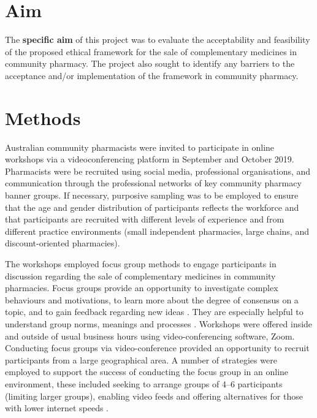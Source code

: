 \documentclass[11pt,a4paper]{article}
\begin{document}


\section{Aim}\label{aim}

The \textbf{specific aim} of this project was to evaluate the
acceptability and feasibility of the proposed ethical framework for the
sale of complementary medicines in community pharmacy. The project also
sought to identify any barriers to the acceptance and/or implementation
of the framework in community pharmacy.

\section{Methods}\label{methods}

Australian community pharmacists were invited to participate in online
workshops via a videoconferencing platform in September and October
2019. Pharmacists were be recruited using social media, professional
organisations, and communication through the professional networks of
key community pharmacy banner groups. If necessary, purposive sampling
was to be employed to ensure that the age and gender distribution of
participants reflects the workforce and that participants are recruited
with different levels of experience and from different practice
environments (small independent pharmacies, large chains, and
discount-oriented pharmacies).

The workshops employed focus group methods to engage participants in
discussion regarding the sale of complementary medicines in community
pharmacies. Focus groups provide an opportunity to investigate complex
behaviours and motivations, to learn more about the degree of consensus
on a topic, and to gain feedback regarding new ideas
\autocites{Basch1987}{Knodel1993}. They are especially helpful to
understand group norms, meanings and processes \autocite{BarbourFG2011}.
Workshops were offered inside and outside of usual business hours using
video-conferencing software, Zoom. Conducting focus groups via
video-conference provided an opportunity to recruit participants from a
large geographical area. A number of strategies were employed to support
the success of conducting the focus group in an online environment,
these included seeking to arrange groups of 4--6 participants (limiting
larger groups), enabling video feeds and offering alternatives for those
with lower internet speeds \autocite{Gaiser2017}.
\end{document}

